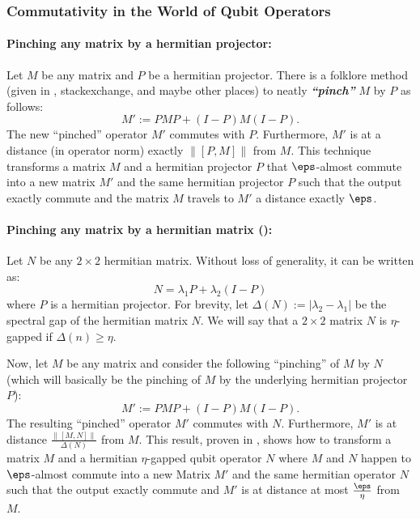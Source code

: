 
\subsubsection{Commutativity in the World of Qubit Operators}
\paragraph{Pinching any matrix by a hermitian projector:}
Let $M$ be any matrix and $P$ be a hermitian projector. There is a folklore method (given in \cite{overlapping}, stackexchange, and maybe other places) to neatly  \textbf{\emph{``pinch''}} $M$ by $P$ as follows:
\begin{equation}
    M' := PMP + (I-P)M(I - P).
\end{equation}
The new ``pinched'' operator $M'$ commutes with $P$. Furthermore, $M'$ is at a distance (in operator norm) exactly $\|[P, M]\|$ from $M$. This technique transforms a matrix $M$ and a hermitian projector $P$ that $\eps$-almost commute into a new matrix $M'$ and the same hermitian projector $P$ such that the output exactly commute and the matrix $M$ travels to $M'$ a distance exactly $\eps$.

\paragraph{Pinching any matrix by a hermitian matrix ():}
Let $N$ be any $2 \times 2$ hermitian matrix. Without loss of generality, it can be written as:
\begin{equation}
\label{eqn:hermitian-2-2}
    N = \lambda_1 P + \lambda_2 (I - P)
\end{equation}
where $P$ is a hermitian projector. For brevity, let $\Delta(N) := |\lambda_2 - \lambda_1|$ be the spectral gap of the hermitian matrix $N$. We will say that a $2 \times 2$ matrix $N$ is $\eta$-gapped if $\Delta(n) \geq \eta$.

Now, let $M$ be any matrix and consider the following ``pinching'' of $M$ by $N$ (which will basically be the pinching of $M$ by the underlying hermitian projector $P$):
\begin{equation}
    M' := PMP + (I-P)M(I-P).
\end{equation}
The resulting ``pinched'' operator $M'$ commutes with $N$. Furthermore, $M'$ is at distance $\frac{\|[M, N]\|}{\Delta(N)}$ from $M$. This result, proven in , shows how to transform a matrix $M$ and a hermitian $\eta$-gapped qubit operator $N$ where $M$ and $N$ happen to $\eps$-almost commute into a new Matrix $M'$ and the same hermitian operator $N$ such that the output exactly commute and $M'$ is at distance at most $\frac{\eps}{\eta}$ from $M$.

